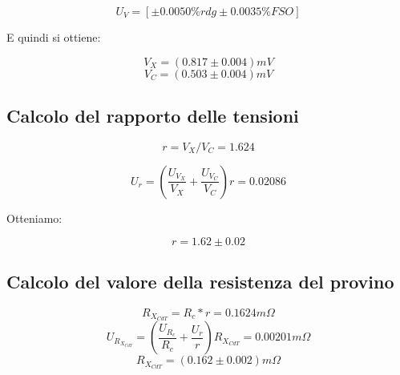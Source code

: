 \documentclass[a4paper]{article}
\begin{document}
\begin{Large} 
	\begin{equation}
		U_{V} = [\pm 0.0050\%rdg \pm 0.0035\% FSO]
	 \end{equation}
\end{Large}
E quindi si ottiene:
\begin{Large} 
	\begin{equation}
		V_X = (0.817 \pm 0.004) mV
	 \end{equation}
	 \begin{equation}
		V_C = (0.503 \pm 0.004) mV
	 \end{equation}
\end{Large}
\subsection{Calcolo del rapporto delle tensioni}
\begin{Large}
	\begin{equation}
		r = {V_X}/{V_C}= 1.624
	 \end{equation}
\end{Large}
\begin{Large} 
	 \begin{equation}
		U_{r} = (\frac{U_{V_X}}{V_X}+\frac{U_{V_C}}{V_C})r = 0.02086
	 \end{equation}
\end{Large}
Otteniamo:
\begin{Large} 
	\begin{equation}
		r = 1.62 \pm 0.02
	 \end{equation}
\end{Large}
\subsection{Calcolo del valore della resistenza del provino}
\begin{Large} 
	\begin{equation}
		R_{X_{CdT}} = R_c* r = 0.1624 m\Omega
	 \end{equation}
	 \begin{equation}
		U_{R_{X_{CdT}}} =(\frac{U_{R_c}}{R_c}+ \frac{U_r}{r})R_{X_{CdT}}= 0.00201 m\Omega
	 \end{equation}
	 \begin{equation}
		R_{X_{CdT}} = (0.162 \pm 0.002 ) m\Omega
	 \end{equation}
\end{Large}
\end{document}
